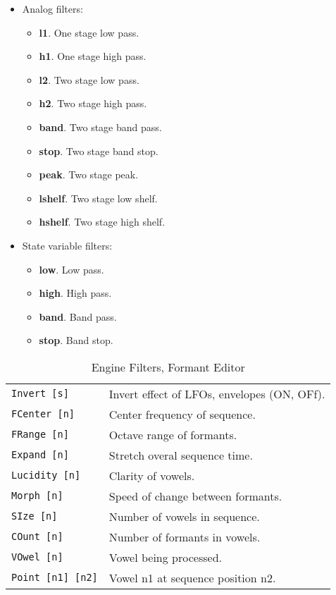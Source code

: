    \begin{itemize}
      \item Analog filters:
      \begin{itemize}
          \item \textbf{l1}. One stage low pass.
          \item \textbf{h1}. One stage high pass.
          \item \textbf{l2}. Two stage low pass.
          \item \textbf{h2}. Two stage high pass.
          \item \textbf{band}. Two stage band pass.
          \item \textbf{stop}. Two stage band stop.
          \item \textbf{peak}. Two stage peak.
          \item \textbf{lshelf}. Two stage low shelf.
          \item \textbf{hshelf}. Two stage high shelf.
      \end{itemize}
      \item State variable filters:
      \begin{itemize}
         \item \textbf{low}. Low pass.
         \item \textbf{high}. High pass.
         \item \textbf{band}. Band pass.
         \item \textbf{stop}. Band stop.
      \end{itemize}
   \end{itemize}

   \begin{table}[H]
      \centering
      \caption{Engine Filters, Formant Editor}
      \label{table:yoshimi_engine_filters_formant_editor}
      \begin{tabular}{l l}

\texttt{Invert [s]} &
   Invert effect of LFOs, envelopes (ON, OFf). \\
\texttt{FCenter [n]} &
   Center frequency of sequence. \\
\texttt{FRange [n]} &
   Octave range of formants. \\
\texttt{Expand [n]} &
   Stretch overal sequence time. \\
\texttt{Lucidity [n]} &
   Clarity of vowels. \\
\texttt{Morph [n]} &
   Speed of change between formants. \\
\texttt{SIze [n]} &
   Number of vowels in sequence. \\
\texttt{COunt [n]} &
   Number of formants in vowels. \\
\texttt{VOwel [n]} &
   Vowel being processed. \\
\texttt{Point [n1] [n2]} &
   Vowel n1 at sequence position n2. \\

      \end{tabular}
   \end{table}

